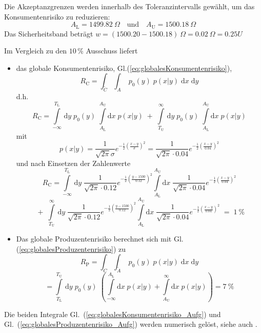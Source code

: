 Die Akzeptanzgrenzen werden innerhalb des Toleranzintervalls gewählt, um das
Konsumentenrisiko zu reduzieren:
\[
A_\mathrm{L} = 1499.82~\Omega \quad \textrm{und} \quad A_\mathrm{U} = 1500.18~\Omega
\]
Das Sicherheitsband beträgt $w = (1500.20-1500.18)~\Omega = 0.02~\Omega = 0.25 U$

Im Vergleich zu den $10 \, \%$ Ausschuss liefert
\begin{itemize}
\item das globale Konsumentenrisiko, Gl.(\ref{eq:globalesKonsumentenrisiko}),
\begin{equation}
	R_\mathrm{C} =  \int_{\tilde C} \int_{A} \; p_0(y) \; p(x|y) \;\mathrm{d}x\; \mathrm{d}y
	\label{eq:globalesKonsumentenrisiko_Aufg}
\end{equation}
d.h.
$$
R_\mathrm{C} =  \int\limits_{-\infty}^{T_\mathrm{L}} \, \mathrm{d}y\; p_0(y) \;
 \int\limits_{A_\mathrm{L}}^{A_\mathrm{U}} \mathrm{d}x \; p(x|y) \; + \;
 \int\limits_{T_\mathrm{U}}^{\infty} \, \mathrm{d}y\; p_0(y) \;
  \int\limits_{A_\mathrm{L}}^{A_\mathrm{U}} \mathrm{d}x \; p(x|y)
$$
mit
\begin{equation}
	p(x|y) =\frac{1}{\sqrt{2 \pi} \sigma}
	e^{-\frac{1}{2}\left(\frac{x - y}{\sigma}\right)^2} =
	\frac{1}{\sqrt{2 \pi} \cdot 0.04}
		e^{-\frac{1}{2}\left(\frac{x - y}{0.04}\right)^2}
\end{equation}
und nach Einsetzen der Zahlenwerte
$$
 R_\mathrm{C} = \int\limits_{-\infty}^{T_\mathrm{L}} \, \mathrm{d}y\;
 \frac{1}{\sqrt{2 \pi} \cdot 0.12}
 e^{-\frac{1}{2}\left(\frac{y - 1500}{0.12}\right)^2}
 \int\limits_{A_\mathrm{L}}^{A_\mathrm{U}} \mathrm{d}x \;
 \frac{1}{\sqrt{2 \pi} \cdot 0.04}
   e^{-\frac{1}{2}\left(\frac{x - y}{0.04}\right)^2}
$$
$$
   \; + \;
   \int\limits_{T_\mathrm{U}}^{\infty} \, \mathrm{d}y\;
  \frac{1}{\sqrt{2 \pi} \cdot 0.12}
  e^{-\frac{1}{2}\left(\frac{y - 1500}{0.12}\right)^2}
  \int\limits_{A_\mathrm{L}}^{A_\mathrm{U}} \mathrm{d}x \;
  \frac{1}{\sqrt{2 \pi} \cdot 0.04}
    e^{-\frac{1}{2}\left(\frac{x - y}{0.04}\right)^2}
  \; = \; 1~\%
$$
\item Das globale Produzentenrisiko berechnet sich mit Gl.(\ref{eq:globalesProduzentenrisiko}) zu
\begin{equation}
	R_\mathrm{P} =  \int_{C} \int_{\tilde A} \; p_0(y) \; p(x|y) \; \mathrm{d}x\; \mathrm{d}y
  \label{eq:globalesProduzentenrisiko_Aufg}
\end{equation}
$$
	=  \int\limits_{T_\mathrm{L}}^{T_\mathrm{U}} \, \mathrm{d}y\; p_0(y) \;
 \left(\int\limits_{-\infty}^{A_\mathrm{L}} \mathrm{d}x \; p(x|y)
 + \int\limits_{A_\mathrm{U}}^{\infty} \mathrm{d}x \; p(x|y) \right)  = 7~\%
$$
\end{itemize}
Die beiden Integrale Gl.~(\ref{eq:globalesKonsumentenrisiko_Aufg})
und Gl.~(\ref{eq:globalesProduzentenrisiko_Aufg}) werden numerisch gelöst,
siehe auch \cite{JCGM106}.

